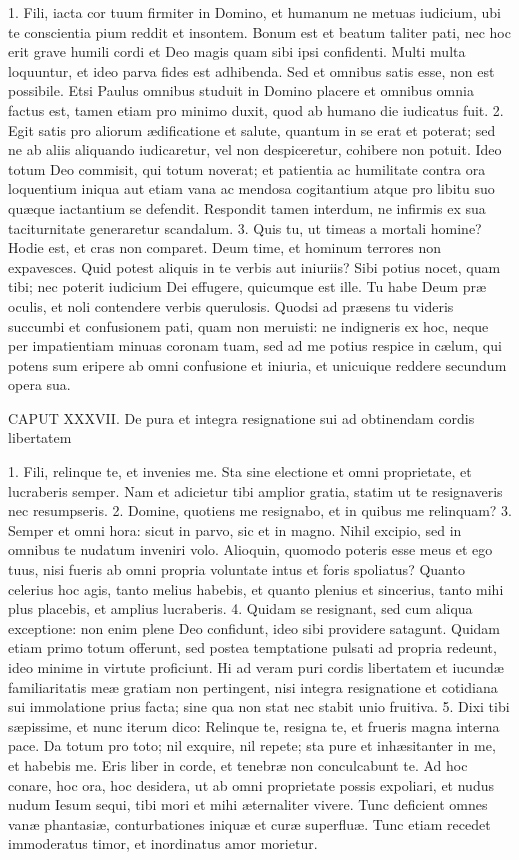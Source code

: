 \documentclass[twoside]{article}
\begin{document}
1. Fili, iacta cor tuum firmiter in Domino, et humanum ne metuas iudicium, ubi te conscientia pium reddit et insontem. Bonum est et beatum taliter pati, nec hoc erit grave humili cordi et Deo magis quam sibi ipsi confidenti. Multi multa loquuntur, et ideo parva fides est adhibenda. Sed et omnibus satis esse, non est possibile. Etsi Paulus omnibus studuit in Domino placere et omnibus omnia factus est, tamen etiam pro minimo duxit, quod ab humano die iudicatus fuit.
2. Egit satis pro aliorum ædificatione et salute, quantum in se erat et poterat; sed ne ab aliis aliquando iudicaretur, vel non despiceretur, cohibere non potuit. Ideo totum Deo commisit, qui totum noverat; et patientia ac humilitate contra ora loquentium iniqua aut etiam vana ac mendosa cogitantium atque pro libitu suo quæque iactantium se defendit. Respondit tamen interdum, ne infirmis ex sua taciturnitate generaretur scandalum.
3. Quis tu, ut timeas a mortali homine? Hodie est, et cras non comparet. Deum time, et hominum terrores non expavesces. Quid potest aliquis in te verbis aut iniuriis? Sibi potius nocet, quam tibi; nec poterit iudicium Dei effugere, quicumque est ille. Tu habe Deum præ oculis, et noli contendere verbis querulosis. Quodsi ad præsens tu videris succumbi et confusionem pati, quam non meruisti: ne indigneris ex hoc, neque per impatientiam minuas coronam tuam, sed ad me potius respice in cælum, qui potens sum eripere ab omni confusione et iniuria, et unicuique reddere secundum opera sua.


CAPUT XXXVII.
De pura et integra resignatione sui ad obtinendam cordis libertatem

1. Fili, relinque te, et invenies me. Sta sine electione et omni proprietate, et lucraberis semper. Nam et adicietur tibi amplior gratia, statim ut te resignaveris nec resumpseris.
2. Domine, quotiens me resignabo, et in quibus me relinquam?
3. Semper et omni hora: sicut in parvo, sic et in magno. Nihil excipio, sed in omnibus te nudatum inveniri volo. Alioquin, quomodo poteris esse meus et ego tuus, nisi fueris ab omni propria voluntate intus et foris spoliatus? Quanto celerius hoc agis, tanto melius habebis, et quanto plenius et sincerius, tanto mihi plus placebis, et amplius lucraberis.
4. Quidam se resignant, sed cum aliqua exceptione: non enim plene Deo confidunt, ideo sibi providere satagunt. Quidam etiam primo totum offerunt, sed postea temptatione pulsati ad propria redeunt, ideo minime in virtute proficiunt. Hi ad veram puri cordis libertatem et iucundæ familiaritatis meæ gratiam non pertingent, nisi integra resignatione et cotidiana sui immolatione prius facta; sine qua non stat nec stabit unio fruitiva.
5. Dixi tibi sæpissime, et nunc iterum dico: Relinque te, resigna te, et frueris magna interna pace. Da totum pro toto; nil exquire, nil repete; sta pure et inhæsitanter in me, et habebis me. Eris liber in corde, et tenebræ non conculcabunt te. Ad hoc conare, hoc ora, hoc desidera, ut ab omni proprietate possis expoliari, et nudus nudum Iesum sequi, tibi mori et mihi æternaliter vivere. Tunc deficient omnes vanæ phantasiæ, conturbationes iniquæ et curæ superfluæ. Tunc etiam recedet immoderatus timor, et inordinatus amor morietur.
\end{document}
